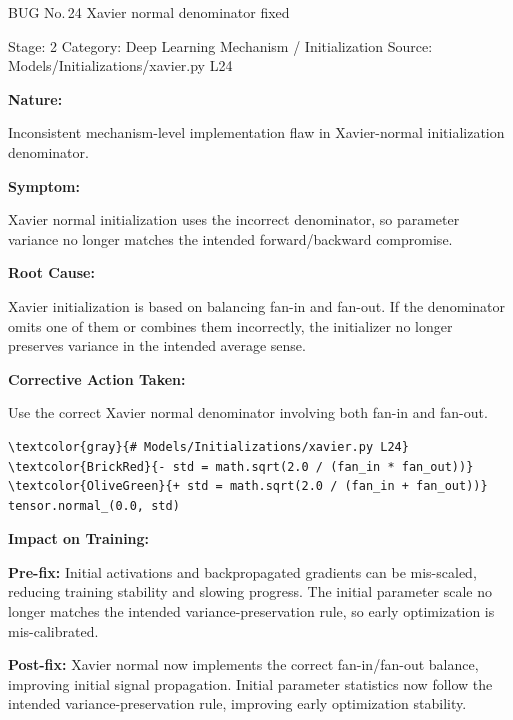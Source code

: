 \documentclass[10pt]{article}
\newcommand{\FieldLabel}[1]{%
 {\bfseries #1:}\par
}
\begin{document}
\begin{bugbox}{BUG No.\,24 \quad Xavier normal denominator fixed}
{\color{MetaGray}\small Stage: 2 \;\textbar\; Category: Deep Learning Mechanism / Initialization \;\textbar\; Source: Models/Initializations/xavier.py L24\par}
\vspace{0.22em}
\FieldLabel{Nature}
Inconsistent mechanism-level implementation flaw in Xavier-normal initialization denominator.
\par
\vspace{0.35em}
\FieldLabel{Symptom}
Xavier normal initialization uses the incorrect denominator, so parameter variance no longer matches the intended forward/backward compromise.
\par
\vspace{0.35em}
\FieldLabel{Root Cause}
Xavier initialization is based on balancing fan-in and fan-out. If the denominator omits one of them or combines them incorrectly, the initializer no longer preserves variance in the intended average sense.
\par
\vspace{0.35em}
\FieldLabel{Corrective Action Taken}
Use the correct Xavier normal denominator involving both fan-in and fan-out.
\par
\vspace{0.35em}
\begin{Verbatim}[commandchars=\\\{\},fontsize=\footnotesize,breaklines=true,breaksymbol={},frame=leftline,framerule=2pt,rulecolor=\color{gray!40},xleftmargin=6pt,formatcom=\singlespacing]
\textcolor{gray}{# Models/Initializations/xavier.py L24}
\textcolor{BrickRed}{- std = math.sqrt(2.0 / (fan_in * fan_out))}
\textcolor{OliveGreen}{+ std = math.sqrt(2.0 / (fan_in + fan_out))}
tensor.normal_(0.0, std)
\end{Verbatim}
\vspace{0.22em}
\FieldLabel{Impact on Training}
\textbf{Pre-fix:} Initial activations and backpropagated gradients can be mis-scaled, reducing training stability and slowing progress. The initial parameter scale no longer matches the intended variance-preservation rule, so early optimization is mis-calibrated. \par\smallskip
\textbf{Post-fix:} Xavier normal now implements the correct fan-in/fan-out balance, improving initial signal propagation. Initial parameter statistics now follow the intended variance-preservation rule, improving early optimization stability. 
\par
\vspace{0.35em}
\end{bugbox}
\end{document}
